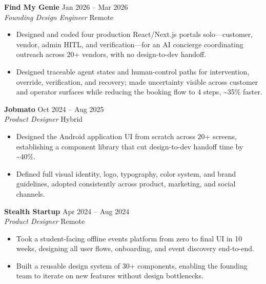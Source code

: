 \documentclass[a4paper,10pt]{article}
\begin{document}
\noindent
\textbf{Find My Genie} \hfill Jan 2026 -- Mar 2026 \\
\textit{Founding Design Engineer} \hfill Remote
\begin{itemize}[noitemsep, topsep=0pt, leftmargin=1.5em]
    \item Designed and coded four production React/Next.js portals solo---customer, vendor, admin HITL, and verification---for an AI concierge coordinating outreach across 20+ vendors, with no design-to-dev handoff.
    \item Designed traceable agent states and human-control paths for intervention, override, verification, and recovery; made uncertainty visible across customer and operator surfaces while reducing the booking flow to 4 steps, \textasciitilde{}35\% faster.
\end{itemize}
\vspace{4pt}

\noindent
\textbf{Jobmato} \hfill Oct 2024 -- Aug 2025 \\
\textit{Product Designer} \hfill Hybrid
\begin{itemize}[noitemsep, topsep=0pt, leftmargin=1.5em]
    \item Designed the Android application UI from scratch across 20+ screens, establishing a component library that cut design-to-dev handoff time by \textasciitilde{}40\%.
    \item Defined full visual identity, logo, typography, color system, and brand guidelines, adopted consistently across product, marketing, and social channels.
\end{itemize}
\vspace{4pt}

\noindent
\textbf{Stealth Startup} \hfill Apr 2024 -- Aug 2024 \\
\textit{Product Designer} \hfill Remote
\begin{itemize}[noitemsep, topsep=0pt, leftmargin=1.5em]
    \item Took a student-facing offline events platform from zero to final UI in 10 weeks, designing all user flows, onboarding, and event discovery end-to-end.
    \item Built a reusable design system of 30+ components, enabling the founding team to iterate on new features without design bottlenecks.
\end{itemize}

\end{document}
